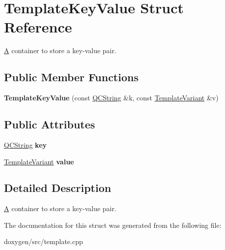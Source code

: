 \hypertarget{struct_template_key_value}{}\section{Template\+Key\+Value Struct Reference}
\label{struct_template_key_value}


\mbox{\hyperlink{class_a}{A}} container to store a key-\/value pair.  


\subsection*{Public Member Functions}
\begin{DoxyCompactItemize}
\item 
\mbox{\label{struct_template_key_value_a0d7b8fd0d50a39b79d91b20aa9637d5e}} 
{\bfseries Template\+Key\+Value} (const \mbox{\hyperlink{class_q_c_string}{Q\+C\+String}} \&k, const \mbox{\hyperlink{class_template_variant}{Template\+Variant}} \&v)
\end{DoxyCompactItemize}
\subsection*{Public Attributes}
\begin{DoxyCompactItemize}
\item 
\mbox{\label{struct_template_key_value_a0ddc1f84556f7fe45971a16393a9e193}} 
\mbox{\hyperlink{class_q_c_string}{Q\+C\+String}} {\bfseries key}
\item 
\mbox{\label{struct_template_key_value_aafe9623dcfaab1220ff3e6e65fe4cdde}} 
\mbox{\hyperlink{class_template_variant}{Template\+Variant}} {\bfseries value}
\end{DoxyCompactItemize}


\subsection{Detailed Description}
\mbox{\hyperlink{class_a}{A}} container to store a key-\/value pair. 

The documentation for this struct was generated from the following file\+:\begin{DoxyCompactItemize}
\item 
doxygen/src/template.\+cpp\end{DoxyCompactItemize}
